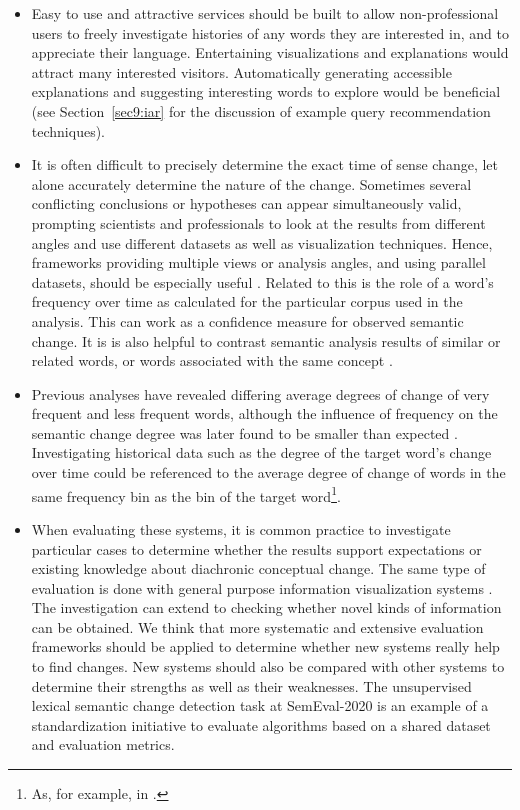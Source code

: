 \documentclass[output=paper%
]{langsci/langscibook}
\begin{document}
\begin{itemize}\sloppy
\item Easy to use and attractive services should be built to allow non-professional users to freely investigate histories of any words they are interested in, and to appreciate their language. Entertaining visualizations and explanations would  attract many interested visitors. Automatically generating accessible explanations and suggesting interesting words to explore would be beneficial (see Section~\ref{sec9:iar} for the discussion of example query recommendation techniques).

\item It is often difficult to precisely determine the exact time of sense change, let alone accurately determine the nature of the change. Sometimes several conflicting conclusions or hypotheses can appear simultaneously valid, prompting scientists and professionals to look at the results from different angles and use different datasets as well as visualization techniques.
Hence, frameworks providing multiple  views or analysis angles, and using parallel datasets, should be especially useful \citep[e.g.][]{jatowt2018every,kalouli2019parhistvis,jeseme}. Related to this is the role of a word's frequency over time as calculated for the particular corpus used in the analysis. This can work as a confidence measure for observed semantic change. It is is also helpful to contrast semantic analysis results of similar or related words, or words associated with the same concept  \citep[e.g.][]{jatowt2018every}.

\item Previous analyses \citep{hamilton-etal-2016-diachronic,pagel2007frequency,lieberman2007quantifying} have revealed differing average degrees of change of very frequent and less frequent words, although the influence of frequency on the semantic change degree was later found to be smaller than expected \citep{dubossarsky-etal-2017-outta}. Investigating historical data such as the degree of the target word's change over time could be  referenced to the average degree of change of words in the same frequency bin as the bin of the target word\footnote{As, for example, in \citet{jatowt2018every}.}. 
\item When evaluating these systems, it is common practice to investigate particular cases to determine whether the results support expectations or existing knowledge about diachronic conceptual change. The same type of evaluation is done with general purpose information visualization systems \citep{carpendale2008}. The investigation can extend to checking whether novel kinds of information can be obtained. We think that more systematic and extensive evaluation frameworks should be applied to determine whether new systems really help to find changes. New systems should also be compared with other systems to determine their strengths as well as their weaknesses. The unsupervised lexical semantic change detection task \citep{schlechtweg-etal-2020-semeval} at SemEval-2020 is an example of a  standardization initiative to evaluate algorithms based on a shared dataset and evaluation metrics. 


\end{itemize}
\end{document}
